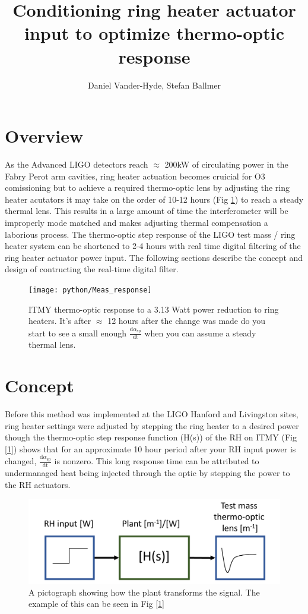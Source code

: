 \documentclass[colorlinks=true,pdfstartview=FitV,linkcolor=blue,
            citecolor=magenta,urlcolor=red]{ligodoc}
\title{Conditioning ring heater actuator input to optimize thermo-optic response}
\author{Daniel Vander-Hyde, Stefan Ballmer}
\begin{document}
\section{Overview}
\label{sec:I}
As the Advanced LIGO detectors reach $\approx$ 200kW of circulating power in the Fabry Perot arm cavities, ring heater actuation becomes cruicial for O3 comissioning but to achieve a required thermo-optic lens by adjusting the ring heater acutators it may take on the order of 10-12 hours (Fig \ref{fig:meas}) to reach a steady thermal lens. This results in a large amount of time the interferometer will be improperly mode matched and makes adjusting thermal compensation a laborious process. The thermo-optic step response of the LIGO test mass / ring heater system can be shortened to 2-4 hours with real time digital filtering of the ring heater actuator power input. The following sections describe the concept and design of contructing the real-time digital filter.


\begin{figure}[H]
 \texttt{[image: python/Meas\_response]}
 \caption{ITMY thermo-optic response to a 3.13 Watt power reduction to ring heaters. It's after $\approx$ 12 hours after the change was made do you start to see a small enough $\frac{\mathrm{d} \alpha_\mathrm{sp}}{\mathrm{dt}}$ when you can assume a steady thermal lens.}
 \label{fig:meas}
\end{figure}
\section{Concept}
\label{sec:III}

Before this method was implemented at the LIGO Hanford and Livingston sites, ring heater settings were adjusted by stepping the ring heater to a desired power though the thermo-optic step response function (H(s)) of the RH on ITMY (Fig [\ref{fig:meas}]) shows that for an approximate 10 hour period after your RH input power is changed,  $\frac{\mathrm{d}\alpha_{\mathrm{sp}}}{\mathrm{dt}}$ is nonzero. This long response time can be attributed to undermanaged heat being injected through the optic by stepping the power to the RH actuators.

\begin{figure}[H]
\includegraphics[page=1,width=\textwidth]{RH_input_filter_figures.pdf}
\caption{A pictograph showing how the plant transforms the signal. The example of this can be seen in Fig [\ref{fig:meas}]}
\label{fig:justplant}
\end{figure}
\end{document}

